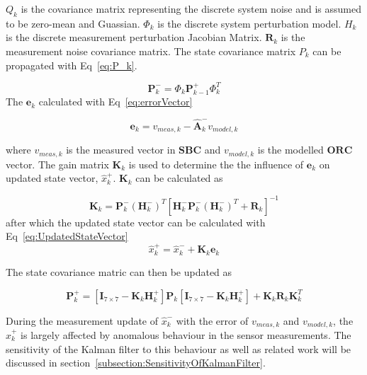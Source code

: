 $Q_k$ is the covariance matrix representing the discrete system noise and is assumed to be zero-mean and Guassian. $\Phi_k$ is the discrete system perturbation model. $H_k$ is the discrete measurement perturbation Jacobian Matrix. $\mathbf{R}_k$ is the measurement noise covariance matrix. The state covariance matrix $P_k$ can be propagated with Eq~\ref{eq:P_k}.

\begin{equation}
	\mathbf{P}_k^- = \Phi_k \mathbf{P}_{k-1}^+ \Phi_k ^T
	\label{eq:P_k}
\end{equation}
The $\mathbf{e}_k$ calculated with Eq~\ref{eq:errorVector}

\begin{equation}
	\mathbf{e}_k = v_{meas,k} - \hat{\mathbf{A}}_k^- v_{model,k}
	\label{eq:errorVector}
\end{equation}

where $v_{meas,k}$ is the measured vector in $\mathbf{SBC}$ and $v_{model,k}$ is the modelled $\mathbf{ORC}$ vector. The gain matrix $\mathbf{K}_k$ is used to determine the the influence of $\mathbf{e}_k$ on updated state vector, $\hat{x}_k^+$. $\mathbf{K}_k$ can be calculated as 

\begin{equation}
	\mathbf{K}_k = \mathbf{P}_k^- (\mathbf{H}_k^-)^T \left[\mathbf{H}_k^- \mathbf{P}_k^- (\mathbf{H}_k^-)^T + \mathbf{R}_k \right]^{-1}
\end{equation}
after which the updated state vector can be calculated with Eq~\ref{eq:UpdatedStateVector}
\begin{equation}
	\hat{x}_k^+ = \hat{x}_k^- + \mathbf{K}_k \mathbf{e}_k
	\label{eq:UpdatedStateVector}
\end{equation}

The state covariance matric can then be updated as

\begin{equation}
	\mathbf{P}_k^+ = \left[\mathbf{I}_{7 \times 7} - \mathbf{K}_k \mathbf{H}_k^+ \right]\mathbf{P}_k \left[\mathbf{I}_{7 \times 7} - \mathbf{K}_k \mathbf{H}_k^+ \right] + \mathbf{K}_k \mathbf{R}_k \mathbf{K}_k^T
	\label{eq:Updated_P_k}
\end{equation}

During the measurement update of $\hat{x}_k^-$ with the error of $v_{meas,k}$ and $v_{model,k}$, the $\hat{x}_k^+$ is largely affected by anomalous behaviour in the sensor measurements. The sensitivity of the Kalman filter to this behaviour as well as related work will be discussed in section~\ref{subsection:SensitivityOfKalmanFilter}.

